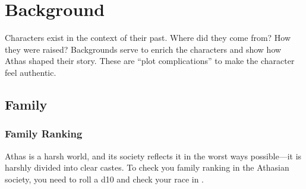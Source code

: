 \clearpage
\section{Background}
Characters exist in the context of their past. Where did they come from? How they were raised? Backgrounds serve to enrich the characters and show how Athas shaped their story. These are ``plot complications'' to make the character feel authentic.

\subsection{Family}

\subsubsection{Family Ranking}
Athas is a harsh world, and its society reflects it in the worst ways possible---it is harshly divided into clear castes. To check you family ranking in the Athasian society, you need to roll a d10 and check your race in .


